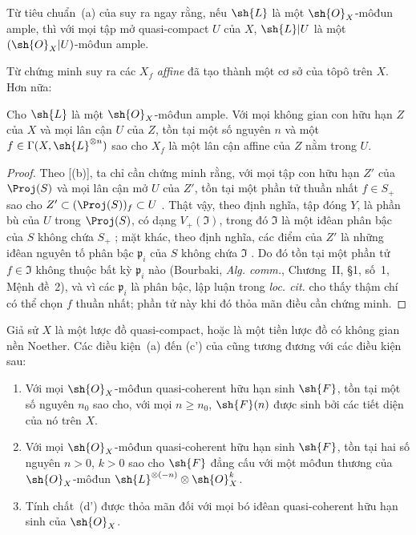 \documentclass[oneside,10pt]{amsart}
\renewcommand{\geq}{\geqslant}
\newcommand{\oldpage}[2][]{\marginnote{\normalfont\footnotesize\textbf{#1}~|~#2}\ignorespaces}
\let\EGAOriginalLabel\label
\renewcommand{\label}[1]{\phantomsection\EGAOriginalLabel{#1}}
\begin{document}
Từ tiêu chuẩn~(a) của  suy ra ngay rằng, nếu $\sh{L}$ là một $\sh{O}_X$-môđun ample, thì với mọi tập mở quasi-compact $U$ của $X$, $\sh{L}|U$ là một $(\sh{O}_X|U)$-môđun ample.

Từ chứng minh  suy ra các $X_f$ \emph{affine} đã tạo thành một cơ sở của tôpô trên $X$.
Hơn nữa:

\begin{corollary}[4.5.4]
\label{II.4.5.4}
Cho $\sh{L}$ là một $\sh{O}_X$-môđun ample.
Với mọi không gian con hữu hạn $Z$ của $X$ và mọi lân cận $U$ của $Z$, tồn tại một số nguyên $n$ và một $f\in\Gamma(X,\sh{L}^{\otimes n})$ sao cho $X_f$ là một lân cận affine của $Z$ nằm trong $U$.
\end{corollary}

\begin{proof}
\oldpage[II]{85}
Theo [(b)], ta chỉ cần chứng minh rằng, với mọi tập con hữu hạn $Z'$ của $\Proj(S)$ và mọi lân cận mở $U$ của $Z'$, tồn tại một phần tử thuần nhất $f\in S_+$ sao cho $Z'\subset(\Proj(S))_f\subset U$ .
Thật vậy, theo định nghĩa, tập đóng $Y$, là phần bù của $U$ trong $\Proj(S)$, có dạng $V_+(\mathfrak{I})$, trong đó $\mathfrak{I}$ là một iđêan phân bậc của $S$ không chứa $S_+$ ;
mặt khác, theo định nghĩa, các điểm của $Z'$ là những iđêan nguyên tố phân bậc $\mathfrak{p}_i$ của $S$ không chứa $\mathfrak{I}$ .
Do đó tồn tại một phần tử $f\in\mathfrak{I}$ không thuộc bất kỳ $\mathfrak{p}_i$ nào (Bourbaki, \emph{Alg. comm.}, Chương~II, \S1, số~1, Mệnh đề~2), và vì các $\mathfrak{p}_i$ là phân bậc, lập luận trong \emph{loc. cit.} cho thấy thậm chí có thể chọn $f$ thuần nhất;
phần tử này khi đó thỏa mãn điều cần chứng minh.
\end{proof}

\begin{proposition}[4.5.5]
\label{II.4.5.5}
Giả sử $X$ là một lược đồ quasi-compact, hoặc là một tiền lược đồ có không gian nền Noether.
Các điều kiện~(a) đến (c') của  cũng tương đương với các điều kiện sau:
\begin{enumerate}
  \item[\rm{(d)}] Với mọi $\sh{O}_X$-môđun quasi-coherent hữu hạn sinh $\sh{F}$, tồn tại một số nguyên $n_0$ sao cho, với mọi $n\geq n_0$, $\sh{F}(n)$ được sinh bởi các tiết diện của nó trên $X$.
  \item[\rm{(d')}] Với mọi $\sh{O}_X$-môđun quasi-coherent hữu hạn sinh $\sh{F}$, tồn tại hai số nguyên $n>0$, $k>0$ sao cho $\sh{F}$ đẳng cấu với một môđun thương của $\sh{O}_X$-môđun $\sh{L}^{\otimes(-n)}\otimes\sh{O}_X^k$.
  \item[\rm{(d'')}] Tính chất~(d') được thỏa mãn đối với mọi bó iđêan quasi-coherent hữu hạn sinh của $\sh{O}_X$.
\end{enumerate}
\end{proposition}
\end{document}
